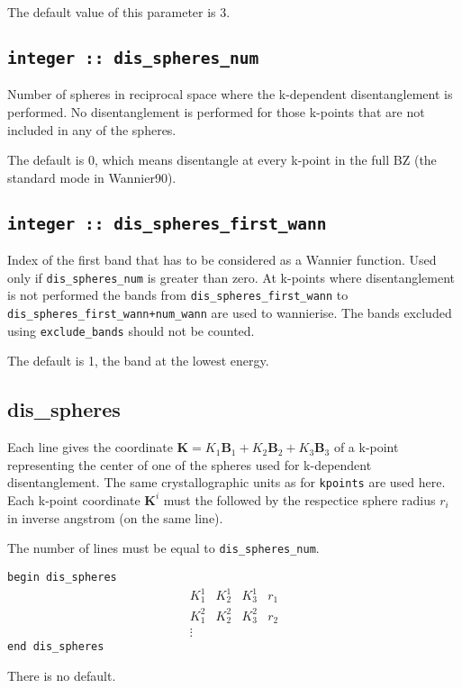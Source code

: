 The default value of this parameter is 3.

\subsection[dis\_spheres\_num]{\tt integer :: dis\_spheres\_num}
Number of spheres in reciprocal space where the k-dependent
disentanglement is performed. No disentanglement is performed for
those k-points that are not included in any of the spheres.

The default is 0, which means disentangle at every k-point in the full BZ (the standard mode in Wannier90).


\subsection[dis\_spheres\_first\_wann]{\tt integer :: dis\_spheres\_first\_wann}
Index of the first band that has to be considered as a Wannier function. Used only if {\tt dis\_spheres\_num} is greater than zero.
At k-points where disentanglement is not performed the bands from
{\tt dis\_spheres\_first\_wann} to {\tt dis\_spheres\_first\_wann+num\_wann} are used
to wannierise. The bands excluded using {\tt exclude\_bands} should not
be counted.

The default is 1, the band at the lowest energy.


\subsection[dis\_spheres]{dis\_spheres}
Each line gives the coordinate $\mathbf{K}=K_1 \mathbf{B}_{1} + K_2
\mathbf{B}_{2} + K_3 \mathbf{B}_3$ of a k-point representing the
center of one of the spheres used for k-dependent disentanglement.
The same crystallographic units as for {\tt kpoints} are used here.
Each k-point coordinate $\mathbf{K}^i$ must the followed by the
respectice sphere radius $r_{i}$ in inverse angstrom (on the same line).

The number of lines must be equal to {\tt dis\_spheres\_num}.

\noindent  \verb#begin dis_spheres#
$$
\begin{array}{cccc}
 K^{1}_{1} & K^{1}_{2} & K^{1}_{3} & r_{1} \\
 K^{2}_{1} & K^{2}_{2} & K^{2}_{3} & r_{2} \\
\vdots
\end{array}
$$
\verb#end dis_spheres#

There is no default.


